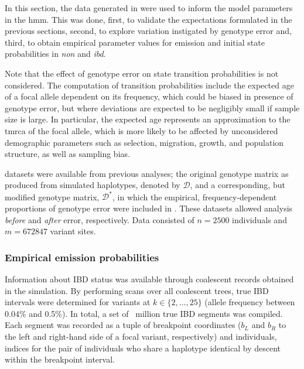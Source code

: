 In this section, the data generated in  were used to inform the model parameters in the \gls{hmm}.
This was done, first, to validate the expectations formulated in the previous sections, second, to explore variation instigated by genotype error and, third, to obtain empirical parameter values for emission and initial state probabilities in \emph{non} and \emph{ibd}.

Note that the effect of genotype error on state transition probabilities is not considered.
The computation of transition probabilities include the expected age of a focal allele dependent on its frequency, which could be biased in presence of genotype error, but where deviations are expected to be negligibly small if sample size is large.
In particular, the expected age represents an approximation to the \gls{tmrca} of the focal allele, which is more likely to be affected by unconsidered demographic parameters such as selection, migration, growth, and population structure, as well as sampling bias.

 datasets were available from previous analyses; the original genotype matrix as produced from simulated haplotypes, denoted by $\mathcal{D}$, and a corresponding, but modified genotype matrix, $\mathcal{D}^\ast$, in which the empirical, frequency-dependent proportions of genotype error were included in .
These datasets allowed analysis \emph{before} and \emph{after} error, respectively.
Data consisted of ${n = \num{2500}}$ individuals and ${m = \num{672847}}$ variant sites.


%
\subsubsection{Empirical emission probabilities}
%

Information about IBD status was available through coalescent records obtained in the simulation.
By performing scans over all coalescent trees, true IBD intervals were determined for \fk{} variants at ${k \in \lbrace 2, \ldots, 25 \rbrace}$ (allele frequency between 0.04\% and 0.5\%).
In total, a set of ~million true IBD segments was compiled.
Each segment was recorded as a tuple of  breakpoint coordinates ($b_L$ and $b_R$ to the left and right-hand side of a focal variant, respectively) and  individuals, \ie indices for the pair of individuals who share a haplotype identical by descent within the breakpoint interval.

